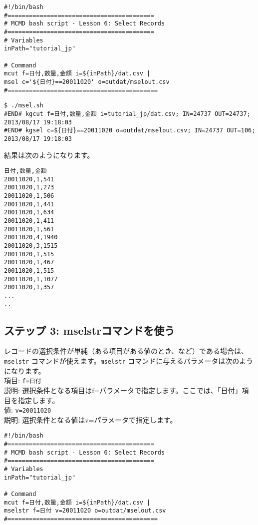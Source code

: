 \begin{verbatim}
#!/bin/bash
#=========================================
# MCMD bash script - Lesson 6: Select Records 
#=========================================
# Variables
inPath="tutorial_jp"

# Command 
mcut f=日付,数量,金額 i=${inPath}/dat.csv |
msel c='${日付}==20011020' o=outdat/mselout.csv
#==========================================
\end{verbatim}

\begin{verbatim}
$ ./msel.sh 
#END# kgcut f=日付,数量,金額 i=tutorial_jp/dat.csv; IN=24737 OUT=24737; 2013/08/17 19:18:03
#END# kgsel c=${日付}==20011020 o=outdat/mselout.csv; IN=24737 OUT=106; 2013/08/17 19:18:03
\end{verbatim}

\noindent
結果は次のようになります。

\begin{verbatim}
日付,数量,金額
20011020,1,541
20011020,1,273
20011020,1,506
20011020,1,441
20011020,1,634
20011020,1,411
20011020,1,561
20011020,4,1940
20011020,3,1515
20011020,1,515
20011020,1,467
20011020,1,515
20011020,1,1077
20011020,1,357
...
..
\end{verbatim}

\subsection*{ステップ 3: mselstrコマンドを使う}

{\setlength{\parindent}{0cm}

レコードの選択条件が単純（ある項目がある値のとき、など）である場合は、\verb|mselstr| コマンドが使えます。\verb|mselstr| コマンドに与えるパラメータは次のようになります。\\

項目: \verb|f=日付| \\
説明: 選択条件となる項目はf=パラメータで指定します。ここでは、「日付」項目を指定します。\\

値: \verb|v=20011020| \\
説明: 選択条件となる値はv=パラメータで指定します。

}

\begin{verbatim}
#!/bin/bash
#=========================================
# MCMD bash script - Lesson 6: Select Records 
#=========================================
# Variables
inPath="tutorial_jp"

# Command 
mcut f=日付,数量,金額 i=${inPath}/dat.csv |
mselstr f=日付 v=20011020 o=outdat/mselout.csv
#==========================================
\end{verbatim}

